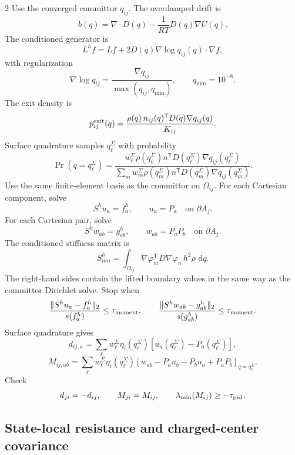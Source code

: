 \documentclass[10pt]{article}
\newcommand{\dd}{\,\mathrm d}
\newcommand{\T}{\mathsf{T}}
\begin{document}
\begin{multicols}{2}
Use the converged committor \(q_{ij}\). The overdamped drift is
\[
b(q)=\nabla\cdot D(q)-\frac{1}{RT}D(q)\nabla U(q).
\]
The conditioned generator is
\[
L^h f=Lf+2D(q)\nabla\log q_{ij}(q)\cdot\nabla f,
\]
with regularization
\[
\nabla\log q_{ij}
=
\frac{\nabla q_{ij}}{\max(q_{ij},q_{\min})},
\qquad
q_{\min}=10^{-8}.
\]
The exit density is
\[
p_{ij}^{\rm exit}(q)
=
\frac{\rho(q)\,n_{ij}(q)^\T D(q)\nabla q_{ij}(q)}
{K_{ij}}.
\]
Surface quadrature samples \(q_\ell^\Sigma\) with probability
\[
\Pr(q=q_\ell^\Sigma)
=
\frac{
w_\ell^\Sigma\rho(q_\ell^\Sigma)
n^\T D(q_\ell^\Sigma)\nabla q_{ij}(q_\ell^\Sigma)
}{
\sum_m w_m^\Sigma\rho(q_m^\Sigma)
n^\T D(q_m^\Sigma)\nabla q_{ij}(q_m^\Sigma)
}.
\]
Use the same finite-element basis as the committor on
\(\Omega_{ij}\). For each Cartesian component, solve
\[
S^h u_a=f_a^h,
\qquad
u_a=P_a\quad\text{on }\partial A_j.
\]
For each Cartesian pair, solve
\[
S^h w_{ab}=g_{ab}^h,
\qquad
w_{ab}=P_aP_b\quad\text{on }\partial A_j.
\]
The conditioned stiffness matrix is
\[
S^h_{mn}
=
\int_{\Omega_{ij}}
\nabla\varphi_m^\T D\nabla\varphi_n\,h^2\rho\,\dd q.
\]
The right-hand sides contain the lifted boundary values in the same way as the
committor Dirichlet solve. Stop when
\[
\frac{\|S^h u_a-f_a^h\|_2}{s(f_a^h)}\le\tau_{\rm moment},
\qquad
\frac{\|S^h w_{ab}-g_{ab}^h\|_2}{s(g_{ab}^h)}\le\tau_{\rm moment}.
\]
Surface quadrature gives
\[
d_{ij,a}=
\sum_\ell w_\ell^\Sigma\eta_i(q_\ell^\Sigma)
[u_a(q_\ell^\Sigma)-P_a(q_\ell^\Sigma)],
\]
\[
M_{ij,ab}=
\sum_\ell w_\ell^\Sigma\eta_i(q_\ell^\Sigma)
[w_{ab}-P_au_b-P_bu_a+P_aP_b]_{q=q_\ell^\Sigma}.
\]
Check
\[
d_{ji}=-d_{ij},
\qquad
M_{ji}=M_{ij},
\qquad
\lambda_{\min}(M_{ij})\ge-\tau_{\rm psd}.
\]

\subsection{State-local resistance and charged-center covariance}


\end{multicols}
\end{document}
